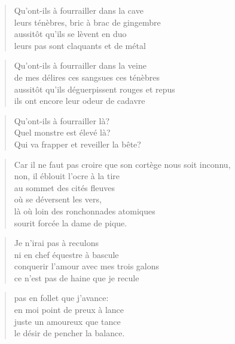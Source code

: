 \newpage
{}
  \begin{verse}
    Qu’ont-ils à fourrailler dans la cave\\
    leurs ténèbres, bric à brac de gingembre\\
    aussitôt qu’ils se lèvent en duo\\
    leurs pas sont claquants et de métal
  \end{verse}
  \begin{verse}
    Qu’ont-ils à fourrailler dans la veine\\
    de mes délires ces sangsues ces ténèbres\\
    aussitôt qu’ils déguerpissent rouges et repus\\
    ils ont encore leur odeur de cadavre
  \end{verse}
  \begin{verse}
    Qu’ont-ils à fourrailler là?\\
    Quel monstre est élevé là?\\
    Qui va frapper et reveiller la bête?
  \end{verse}
  \begin{verse}
    Car il ne faut pas croire que son cortège nous soit inconnu,\\
    non, il éblouit l’ocre à la tire\\
    au sommet des cités fleuves\\
    où se déversent les vers,\\
    là où loin des ronchonnades atomiques\\
    sourit forcée la dame de pique.
  \end{verse}

  \begin{verse}
    Je n’irai pas à reculons\\
    ni en chef équestre à bascule\\
    conquerir l’amour avec mes trois galons\\
    ce n’est pas de haine que je recule
  \end{verse}
  \begin{verse}
    pas en follet que j’avance:\\
    en moi point de preux à lance\\
    juste un amoureux que tance\\
    le désir de pencher la balance.
  \end{verse}
